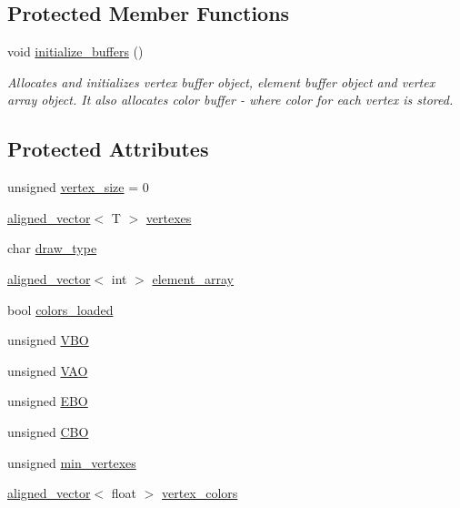 \subsection*{Protected Member Functions}
\begin{DoxyCompactItemize}
\item 
void \mbox{\hyperlink{classShape_a8b4f54a694871f9d131fdd105e1ca709}{initialize\+\_\+buffers}} ()
\begin{DoxyCompactList}\small\item\em Allocates and initializes vertex buffer object, element buffer object and vertex array object. It also allocates color buffer -\/ where color for each vertex is stored. \end{DoxyCompactList}\end{DoxyCompactItemize}
\subsection*{Protected Attributes}
\begin{DoxyCompactItemize}
\item 
unsigned \mbox{\hyperlink{classShape_a7cf9cc243cdd64215eca4d81704c7199}{vertex\+\_\+size}} = 0
\item 
\mbox{\hyperlink{type__definitions_8hpp_accb98a876f193a416d9c8a02fe22d526}{aligned\+\_\+vector}}$<$ T $>$ \mbox{\hyperlink{classShape_a50296217cf654fc7b756b67a2f0305c2}{vertexes}}
\item 
char \mbox{\hyperlink{classShape_a851fcb33238286342f670d27443ffdfc}{draw\+\_\+type}}
\item 
\mbox{\hyperlink{type__definitions_8hpp_accb98a876f193a416d9c8a02fe22d526}{aligned\+\_\+vector}}$<$ int $>$ \mbox{\hyperlink{classShape_accef3084e7e3897e01806b90da0a0ec8}{element\+\_\+array}}
\item 
bool \mbox{\hyperlink{classShape_a216866713d16c882a0f0b0b0a89d350d}{colors\+\_\+loaded}}
\item 
unsigned \mbox{\hyperlink{classShape_a5ca89aadcd89bb475d6ca88acf733ce6}{V\+BO}}
\item 
unsigned \mbox{\hyperlink{classShape_a30771567edd66db5d14dc630f2d63f82}{V\+AO}}
\item 
unsigned \mbox{\hyperlink{classShape_a95c775e548b129e23d2dd32e23fb0f3e}{E\+BO}}
\item 
unsigned \mbox{\hyperlink{classShape_a66502f6f87b46a705d131dc7b0b67d42}{C\+BO}}
\item 
unsigned \mbox{\hyperlink{classShape_acb30d3bdd3434dc2cb3074a4d61985ed}{min\+\_\+vertexes}}
\item 
\mbox{\hyperlink{type__definitions_8hpp_accb98a876f193a416d9c8a02fe22d526}{aligned\+\_\+vector}}$<$ float $>$ \mbox{\hyperlink{classShape_a1590ef02d7090f28d1ad312fd46f5030}{vertex\+\_\+colors}}
\end{DoxyCompactItemize}
